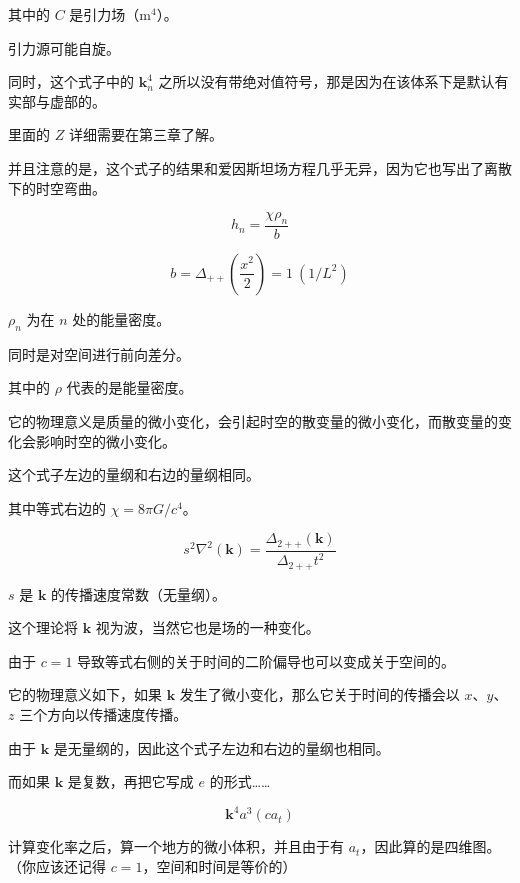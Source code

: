 \documentclass[UTF8]{ctexart}
\begin{document}
其中的 \(C\) 是引力场（m\(^4\)）。

引力源可能自旋。

同时，这个式子中的 \(\mathbf{k}^4_n\) 之所以没有带绝对值符号，那是因为在该体系下是默认有实部与虚部的。

里面的 \(Z\) 详细需要在第三章了解。

并且注意的是，这个式子的结果和爱因斯坦场方程几乎无异，因为它也写出了离散下的时空弯曲。

\begin{equation}
h_n=\frac{\chi\rho_n}{b}
\end{equation}

\begin{equation}
b=\Delta_{++}\left(\frac{x^2}{2}\right)=1\ (1/L^2)
\end{equation}

\(\rho_n\) 为在 \(n\) 处的能量密度。

同时是对空间进行前向差分。

其中的 \(\rho\) 代表的是能量密度。

它的物理意义是质量的微小变化，会引起时空的散变量的微小变化，而散变量的变化会影响时空的微小变化。

这个式子左边的量纲和右边的量纲相同。

其中等式右边的 \(\chi=8\pi G/c^4\)。

\begin{equation}
s^2\nabla^2(\mathbf{k})=\frac{\Delta_{2++}(\mathbf{k})}{\Delta_{2++}t^2}
\end{equation}

\(s\) 是 \(\mathbf{k}\) 的传播速度常数（无量纲）。

这个理论将 \(\mathbf{k}\) 视为波，当然它也是场的一种变化。

由于 \(c=1\) 导致等式右侧的关于时间的二阶偏导也可以变成关于空间的。

它的物理意义如下，如果 \(\mathbf{k}\) 发生了微小变化，那么它关于时间的传播会以 \(x\)、\(y\)、\(z\) 三个方向以传播速度传播。

由于 \(\mathbf{k}\) 是无量纲的，因此这个式子左边和右边的量纲也相同。

而如果 \(\mathbf{k}\) 是复数，再把它写成 \(e\) 的形式……

\begin{equation}
\mathbf{k}^4a^3(ca_t)
\end{equation}

计算变化率之后，算一个地方的微小体积，并且由于有 \(a_t\)，因此算的是四维图。（你应该还记得 \(c=1\)，空间和时间是等价的）
\end{document}
